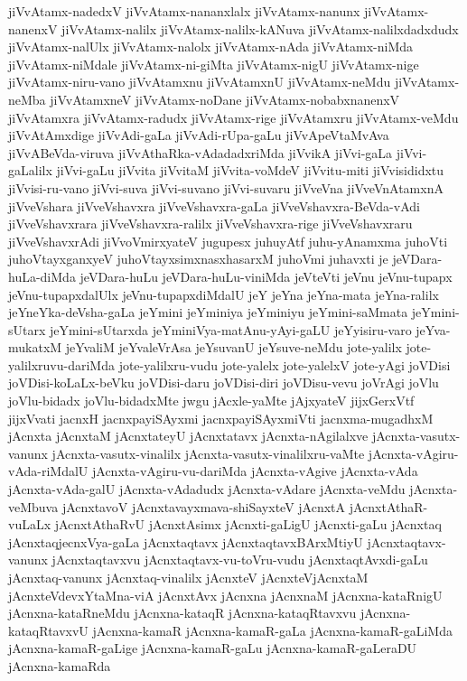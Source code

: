 {jiVvAtamx-nadedxV
jiVvAtamx-nananxlalx
jiVvAtamx-nanunx
jiVvAtamx-nanenxV
jiVvAtamx-nalilx
jiVvAtamx-nalilx-kANuva
jiVvAtamx-nalilxdadxdudx
jiVvAtamx-nalUlx
jiVvAtamx-nalolx
jiVvAtamx-nAda
jiVvAtamx-niMda
jiVvAtamx-niMdale
jiVvAtamx-ni-giMta
jiVvAtamx-nigU
jiVvAtamx-nige
jiVvAtamx-niru-vano
jiVvAtamxnu
jiVvAtamxnU
jiVvAtamx-neMdu
jiVvAtamx-neMba
jiVvAtamxneV
jiVvAtamx-noDane
jiVvAtamx-nobabxnanenxV
jiVvAtamxra
jiVvAtamx-radudx
jiVvAtamx-rige
jiVvAtamxru
jiVvAtamx-veMdu
jiVvAtAmxdige
jiVvAdi-gaLa
jiVvAdi-rUpa-gaLu
jiVvApeVtaMvAva
jiVvABeVda-viruva
jiVvAthaRka-vAdadadxriMda
jiVvikA
jiVvi-gaLa
jiVvi-gaLalilx
jiVvi-gaLu
jiVvita
jiVvitaM
jiVvita-voMdeV
jiVvitu-miti
jiVvisididxtu
jiVvisi-ru-vano
jiVvi-suva
jiVvi-suvano
jiVvi-suvaru
jiVveVna
jiVveVnAtamxnA
jiVveVshara
jiVveVshavxra
jiVveVshavxra-gaLa
jiVveVshavxra-BeVda-vAdi
jiVveVshavxrara
jiVveVshavxra-ralilx
jiVveVshavxra-rige
jiVveVshavxraru
jiVveVshavxrAdi
jiVvoVmirxyateV
jugupesx
juhuyAtf
juhu-yAnamxma
juhoVti
juhoVtayxganxyeV
juhoVtayxsimxnasxhasarxM
juhoVmi
juhavxti
je
jeVDara-huLa-diMda
jeVDara-huLu
jeVDara-huLu-viniMda
jeVteVti
jeVnu
jeVnu-tupapx
jeVnu-tupapxdalUlx
jeVnu-tupapxdiMdalU
jeY
jeYna
jeYna-mata
jeYna-ralilx
jeYneYka-deVsha-gaLa
jeYmini
jeYminiya
jeYminiyu
jeYmini-saMmata
jeYmini-sUtarx
jeYmini-sUtarxda
jeYminiVya-matAnu-yAyi-gaLU
jeYyisiru-varo
jeYva-mukatxM
jeYvaliM
jeYvaleVrAsa
jeYsuvanU
jeYsuve-neMdu
jote-yalilx
jote-yalilxruvu-dariMda
jote-yalilxru-vudu
jote-yalelx
jote-yalelxV
jote-yAgi
joVDisi
joVDisi-koLaLx-beVku
joVDisi-daru
joVDisi-diri
joVDisu-vevu
joVrAgi
joVlu
joVlu-bidadx
joVlu-bidadxMte
jwgu
jAcxle-yaMte
jAjxyateV
jijxGerxVtf
jijxVvati
jacnxH
jacnxpayiSAyxmi
jacnxpayiSAyxmiVti
jacnxma-mugadhxM
jAcnxta
jAcnxtaM
jAcnxtateyU
jAcnxtatavx
jAcnxta-nAgilalxve
jAcnxta-vasutx-vanunx
jAcnxta-vasutx-vinalilx
jAcnxta-vasutx-vinalilxru-vaMte
jAcnxta-vAgiru-vAda-riMdalU
jAcnxta-vAgiru-vu-dariMda
jAcnxta-vAgive
jAcnxta-vAda
jAcnxta-vAda-galU
jAcnxta-vAdadudx
jAcnxta-vAdare
jAcnxta-veMdu
jAcnxta-veMbuva
jAcnxtavoV
jAcnxtavayxmava-shiSayxteV
jAcnxtA
jAcnxtAthaR-vuLaLx
jAcnxtAthaRvU
jAcnxtAsimx
jAcnxti-gaLigU
jAcnxti-gaLu
jAcnxtaq
jAcnxtaqjecnxVya-gaLa
jAcnxtaqtavx
jAcnxtaqtavxBArxMtiyU
jAcnxtaqtavx-vanunx
jAcnxtaqtavxvu
jAcnxtaqtavx-vu-toVru-vudu
jAcnxtaqtAvxdi-gaLu
jAcnxtaq-vanunx
jAcnxtaq-vinalilx
jAcnxteV
jAcnxteVjAcnxtaM
jAcnxteVdevxYtaMna-viA
jAcnxtAvx
jAcnxna
jAcnxnaM
jAcnxna-kataRnigU
jAcnxna-kataRneMdu
jAcnxna-kataqR
jAcnxna-kataqRtavxvu
jAcnxna-kataqRtavxvU
jAcnxna-kamaR
jAcnxna-kamaR-gaLa
jAcnxna-kamaR-gaLiMda
jAcnxna-kamaR-gaLige
jAcnxna-kamaR-gaLu
jAcnxna-kamaR-gaLeraDU
jAcnxna-kamaRda
}
